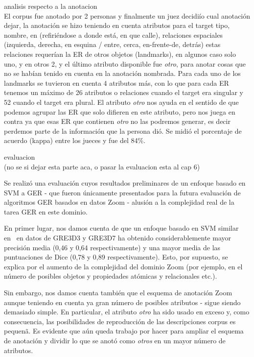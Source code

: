 analisis respecto a la anotacion\\
El corpus fue anotado por 2 personas y finalmente un juez decidi\'io cual anotaci\'on dejar, la anotaci\'on se hizo teniendo en cuenta atributos para el target tipo, nombre, en (refiri\'endose a donde est\'a, en que calle), relaciones espaciales (izquierda, derecha, en esquina / entre, cerca, en-frente-de, detr\'as) estas relaciones requer\'ian la ER de otros objetos (landmarks), en algunos caso solo uno, y en otros 2, y el \'ultimo atributo disponible fue {\it otro}, para anotar cosas que no se hab\'ian tenido en cuenta en la anotaci\'on nombrada. Para cada uno de los landmarks se tuvieron en cuenta 4 atributos m\'as, con lo que para cada ER tenemos un m\'aximo de 26 atributos o relaciones cuando el target era singular y 52 cuando el target era plural. El atributo {\it otro} nos ayuda en el sentido de que podemos agrupar las ER que solo difieren en este atributo, pero nos juega en contra ya que esas ER que contienen {\it otro} no las podremos generar, es decir perdemos parte de la informaci\'on que la persona di\'o. Se midi\'o el porcentaje de acuerdo (kappa) entre los jueces y fue del 84\%. 

evaluacion\\ (no se si dejar esta parte aca, o pasar la evaluacion esta al cap 6)

Se realiz\'o una evaluaci\'on cuyos resultados preliminares de un enfoque basado en SVM a GER - que fueron \'unicamente presentados para la futura evaluaci\'on de algoritmos GER basados en datos Zoom - alusi\'on a la complejidad real de la tarea GER en este dominio.

En primer lugar, nos damos cuenta de que un enfoque basado en SVM similar en~\cite{thiago-svm} en datos de GRE3D3 y GRE3D7 ha obtenido considerablemente mayor precisi\'on media (0,46 y 0,64 respectivamente) y una mayor media de las puntuaciones de Dice (0,78 y 0,89 respectivamente). Esto, por supuesto, se explica por el aumento de la complejidad del dominio Zoom (por ejemplo, en el n\'umero de posibles objetos y propiedades at\'omicas y relacionales etc.). 

Sin embargo, nos damos cuenta tambi\'en que el esquema de anotaci\'on Zoom  aunque teniendo en cuenta ya gran n\'umero de posibles atributos - sigue siendo demasiado simple. En particular, el atributo {\em otro} ha sido usado en exceso y, como consecuencia, las posibilidades de reproducci\'on de las descripciones corpus es pequen\~a. Es evidente que a\'un queda trabajo por hacer para ampliar el esquema de anotaci\'on y dividir lo que se anot\'o como {\em otros} en un mayor n\'umero de atributos.


